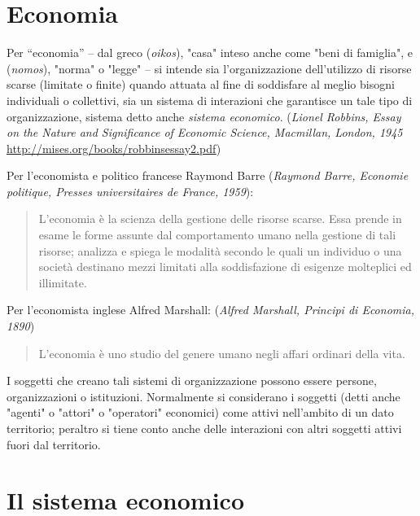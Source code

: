 \section{Economia}
\label{sec:modelli_economia}

Per ``economia'' – dal greco %
(\emph{oikos}), "casa" inteso anche come "beni di famiglia", e %
(\emph{nomos}), "norma" o "legge" – si intende sia l'organizzazione 
dell'utilizzo di risorse scarse (limitate o finite) quando attuata al 
fine di soddisfare al meglio bisogni individuali o collettivi, sia 
un sistema di interazioni che garantisce un tale tipo di organizzazione, 
sistema detto anche \emph{sistema economico}.
(\emph{Lionel Robbins, Essay on the Nature and Significance of Economic 
Science, Macmillan, London, 1945}
\url{http://mises.org/books/robbinsessay2.pdf})

Per l'economista e politico francese Raymond Barre
(\emph{Raymond Barre, Economie politique, Presses universitaires de France, 
1959}): 
\begin{quote}
 L'economia 
è la scienza della gestione delle risorse scarse. Essa prende in esame le forme 
assunte dal comportamento umano nella gestione di tali risorse; analizza e 
spiega le modalità secondo le quali un individuo o una società destinano mezzi 
limitati alla soddisfazione di esigenze molteplici ed illimitate.
\end{quote}


Per l'economista inglese Alfred Marshall:
(\emph{Alfred Marshall, Principi di Economia, 1890})
\begin{quotation}
 L'economia è uno studio del genere umano negli affari ordinari della vita. 
\end{quotation}

I soggetti che creano tali sistemi di organizzazione possono essere persone, 
organizzazioni o istituzioni. Normalmente si considerano i 
soggetti (detti anche "agenti" o "attori" o "operatori" economici) come attivi 
nell'ambito di un dato territorio; peraltro si tiene conto anche delle 
interazioni con altri soggetti attivi fuori dal territorio.

\section{Il sistema economico}
\label{sec:modelli_sistemaeconomico}

